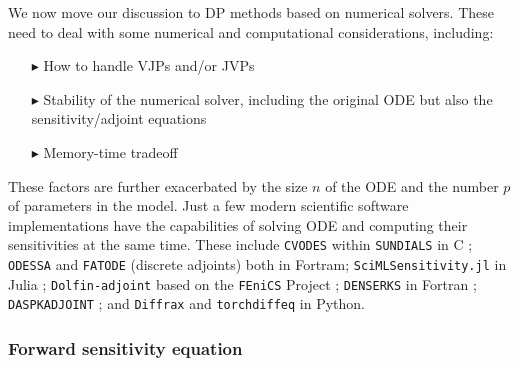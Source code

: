 We now move our discussion to DP methods based on numerical solvers.
These need to deal with some numerical and computational considerations, including:
\begin{enumerate}
    \item[$ \blacktriangleright$] How to handle VJPs and/or JVPs 
    \item[$ \blacktriangleright$] Stability of the numerical solver, including the original ODE but also the sensitivity/adjoint equations
    \item[$ \blacktriangleright$] Memory-time tradeoff
\end{enumerate}
These factors are further exacerbated by the size $n$ of the ODE and the number $p$ of parameters in the model. 
Just a few modern scientific software implementations have the capabilities of solving ODE and computing their sensitivities at the same time. 
These include 
\texttt{CVODES} within \texttt{SUNDIALS} in C \cite{serban2005cvodes, SUNDIALS-hindmarsh2005sundials}; 
\texttt{ODESSA} \cite{ODESSA} and \texttt{FATODE} (discrete adjoints) \cite{FATODE2014} both in Fortram; 
\texttt{SciMLSensitivity.jl} in Julia \cite{rackauckas2020universal}; 
\texttt{Dolfin-adjoint} based on the \texttt{FEniCS} Project \cite{dolfin2013, dolfin2018};
\texttt{DENSERKS} in Fortran \cite{alexe2007denserks}; 
\texttt{DASPKADJOINT} \cite{Cao_Li_Petzold_2002};
and \texttt{Diffrax} \cite{kidger2021on} and \texttt{torchdiffeq} \cite{torchdiffeq} in Python. 


\subsubsection{Forward sensitivity equation}
\label{section:computing-sensitivity-equations}


